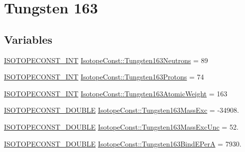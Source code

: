 \hypertarget{group___isotope_const-_tungsten-_w163}{}\section{Tungsten 163}
\label{group___isotope_const-_tungsten-_w163}
\subsection*{Variables}
\begin{DoxyCompactItemize}
\item 
\mbox{\hyperlink{group___isotope_const-_macros_ga5f18360b3e99483a35c32d789e62621c}{I\+S\+O\+T\+O\+P\+E\+C\+O\+N\+S\+T\+\_\+\+I\+NT}} \mbox{\hyperlink{group___isotope_const-_tungsten-_w163_ga6b4cc91f03c5ce8ff81e9472d0f36400}{Isotope\+Const\+::\+Tungsten163\+Neutrons}} = 89
\item 
\mbox{\hyperlink{group___isotope_const-_macros_ga5f18360b3e99483a35c32d789e62621c}{I\+S\+O\+T\+O\+P\+E\+C\+O\+N\+S\+T\+\_\+\+I\+NT}} \mbox{\hyperlink{group___isotope_const-_tungsten-_w163_ga3b0ba55d49cbe1ab2a62cb9466dae9d4}{Isotope\+Const\+::\+Tungsten163\+Protons}} = 74
\item 
\mbox{\hyperlink{group___isotope_const-_macros_ga5f18360b3e99483a35c32d789e62621c}{I\+S\+O\+T\+O\+P\+E\+C\+O\+N\+S\+T\+\_\+\+I\+NT}} \mbox{\hyperlink{group___isotope_const-_tungsten-_w163_ga0ed2e46e8924422a401df75fab114d5b}{Isotope\+Const\+::\+Tungsten163\+Atomic\+Weight}} = 163
\item 
\mbox{\hyperlink{group___isotope_const-_macros_ga8f45a7272ce02c0b4c65c44636ed719a}{I\+S\+O\+T\+O\+P\+E\+C\+O\+N\+S\+T\+\_\+\+D\+O\+U\+B\+LE}} \mbox{\hyperlink{group___isotope_const-_tungsten-_w163_ga03bd59acf828e16d953ad3f24ec80d9f}{Isotope\+Const\+::\+Tungsten163\+Mass\+Exc}} = -\/34908.
\item 
\mbox{\hyperlink{group___isotope_const-_macros_ga8f45a7272ce02c0b4c65c44636ed719a}{I\+S\+O\+T\+O\+P\+E\+C\+O\+N\+S\+T\+\_\+\+D\+O\+U\+B\+LE}} \mbox{\hyperlink{group___isotope_const-_tungsten-_w163_ga0a08edf1d020be8aa59015aef3246bd1}{Isotope\+Const\+::\+Tungsten163\+Mass\+Exc\+Unc}} = 52.
\item 
\mbox{\hyperlink{group___isotope_const-_macros_ga8f45a7272ce02c0b4c65c44636ed719a}{I\+S\+O\+T\+O\+P\+E\+C\+O\+N\+S\+T\+\_\+\+D\+O\+U\+B\+LE}} \mbox{\hyperlink{group___isotope_const-_tungsten-_w163_ga5e3d4bd4310eac619cb2277df3215bc3}{Isotope\+Const\+::\+Tungsten163\+Bind\+E\+PerA}} = 7930.
\item 

\end{DoxyCompactItemize}

